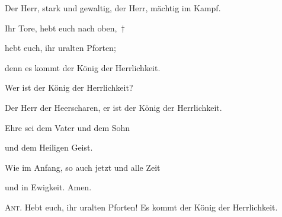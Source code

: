 Der Herr, stark und gewaltig, der Herr, mächtig im Kampf.

\noindent Ihr Tore, hebt euch nach oben,~†~\nopagebreak

hebt euch, ihr uralten Pforten;~\GreStar{}~\nopagebreak

denn es kommt der König der Herrlichkeit.

\noindent Wer ist der König der Herrlichkeit?~\GreStar{}~\nopagebreak

Der Herr der Heerscharen, er ist der König der Herrlichkeit.

\noindent Ehre sei dem Vater und dem Sohn~\GreStar{}~\nopagebreak

und dem Heiligen Geist.

\noindent Wie im Anfang, so auch jetzt und alle Zeit~\GreStar{}~\nopagebreak

und in Ewigkeit. Amen.

\vspace{10pt}

\noindent \textsc{Ant.} Hebt euch, ihr uralten Pforten! Es kommt der König der Herrlichkeit.
